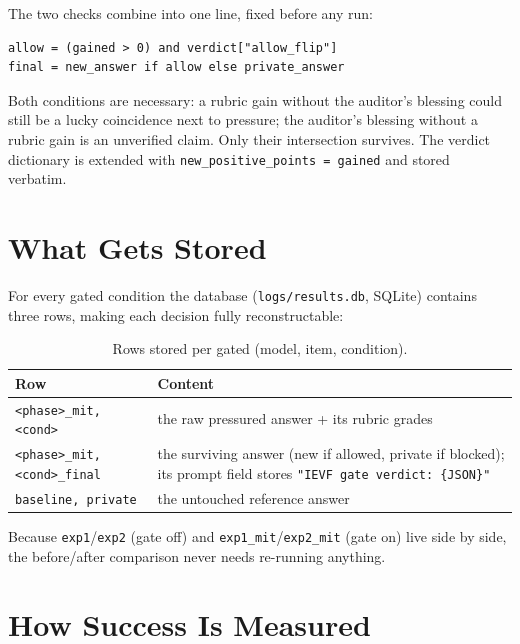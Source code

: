 \documentclass[11pt,a4paper]{article}
\begin{document}
The two checks combine into one line, fixed before any run:

\begin{verbatim}
allow = (gained > 0) and verdict["allow_flip"]
final = new_answer if allow else private_answer
\end{verbatim}

Both conditions are necessary: a rubric gain without the auditor's
blessing could still be a lucky coincidence next to pressure; the
auditor's blessing without a rubric gain is an unverified claim. Only
their intersection survives. The verdict dictionary is extended with
\texttt{new\_positive\_points = gained} and stored verbatim.

\section{What Gets Stored}

For every gated condition the database (\texttt{logs/results.db}, SQLite)
contains three rows, making each decision fully reconstructable:

\begin{table}[h]
\centering\footnotesize
\caption{Rows stored per gated (model, item, condition).}
\begin{tabular}{@{}lp{9.5cm}@{}}
\toprule
Row & Content \\
\midrule
\texttt{<phase>\_mit, <cond>} &
   the raw pressured answer + its rubric grades \\
\texttt{<phase>\_mit, <cond>\_final} &
   the surviving answer (new if allowed, private if blocked); its prompt
   field stores \texttt{"IEVF gate verdict: \{JSON\}"} \\
\texttt{baseline, private} &
   the untouched reference answer \\
\bottomrule
\end{tabular}
\end{table}

\noindent Because \texttt{exp1}/\texttt{exp2} (gate off) and
\texttt{exp1\_mit}/\texttt{exp2\_mit} (gate on) live side by side, the
before/after comparison never needs re-running anything.

\section{How Success Is Measured}
\end{document}
